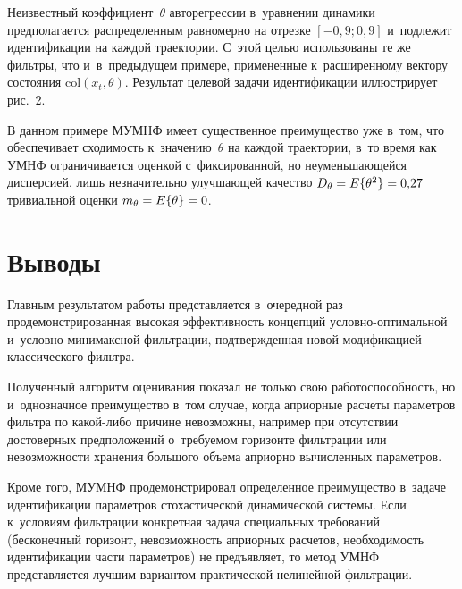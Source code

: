 \begin{multicols}{2}
    Неизвестный коэффициент~$\theta$ авторегрессии в~уравнении динамики 
предполагается распределенным равномерно на отрезке $[-0{,}9; 0{,}9]$ 
и~подлежит идентификации на каждой траектории. С~этой целью 
использованы те же фильтры, что и~в~предыду\-щем примере, примененные 
к~расширенному вектору состояния $\mathrm{col}\left (x_t,\theta\right)$. Результат целевой задачи 
идентификации иллюстрирует рис.~2.
{ %

}
    

    
    В данном примере МУМНФ имеет существенное преимущество уже в~том, 
что обеспечивает сходимость к~значению~$\theta$ на каждой траектории, в~то 
время как УМНФ ограничивается оценкой с~фиксированной, но 
неуменьшающейся дис\-пер\-си\-ей, лишь незначительно улучшающей качество 
$D_\theta\hm= E\{\theta^2\}\hm=0{,}27$ тривиальной оценки 
$m_\theta\hm=E\{\theta\}\hm=0$.

\vspace*{-4pt}

\section{Выводы }

    Главным результатом работы представляется в~очередной раз 
продемонстрированная высокая эффективность концепций 
услов\-но-оп\-ти\-маль\-ной и~услов\-но-ми\-ни\-макс\-ной фильтрации, подтвержденная новой 
модификацией классического фильтра. 

Полученный алгоритм оценивания 
показал не только свою работоспособность, но и~однозначное преимущество 
в~том случае, когда априорные расчеты параметров фильтра по  
ка\-кой-ли\-бо причине невозможны, например при отсутствии достоверных 
предположений о~требуемом горизонте фильт\-ра\-ции или невозможности 
хранения большого объема априорно вычисленных па\-ра\-мет\-ров. 

Кроме того, 
МУМНФ продемонстрировал опреде\-ленное преимущество в~задаче 
идентификации па\-ра\-мет\-ров стохастической динамической сис\-те\-мы. Если 
к~условиям фильтрации конкретная за\-да\-ча специальных требований 
(бесконечный горизонт, невозможность априорных расчетов, необходимость 
идентификации части параметров) не предъявляет, то метод УМНФ 
представляется лучшим вариантом практической нелинейной фильт\-рации.
    
    {\small\frenchspacing
 {\baselineskip=11.7pt
 \begin{thebibliography}{99}


\end{thebibliography}}}
\end{multicols}
